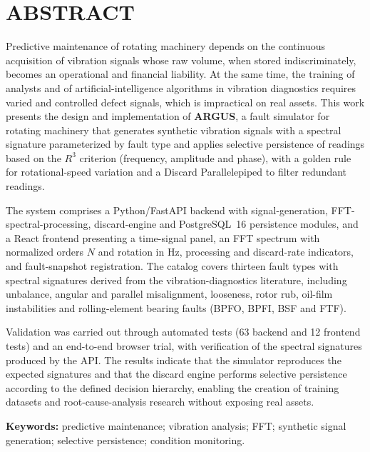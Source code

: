 \chapter*{ABSTRACT}

Predictive maintenance of rotating machinery depends on the continuous
acquisition of vibration signals whose raw volume, when stored
indiscriminately, becomes an operational and financial liability. At the same
time, the training of analysts and of artificial-intelligence algorithms in
vibration diagnostics requires varied and controlled defect signals, which is
impractical on real assets. This work presents the design and implementation of
\textbf{ARGUS}, a fault simulator for rotating machinery that generates synthetic
vibration signals with a spectral signature parameterized by fault type and
applies selective persistence of readings based on the \(R^3\) criterion
(frequency, amplitude and phase), with a golden rule for rotational-speed
variation and a Discard Parallelepiped to filter redundant readings.

The system comprises a Python/FastAPI backend with signal-generation,
FFT-spectral-processing, discard-engine and PostgreSQL~16 persistence modules,
and a React frontend presenting a time-signal panel, an FFT spectrum with
normalized orders \(N\) and rotation in Hz, processing and discard-rate
indicators, and fault-snapshot registration. The catalog covers thirteen fault
types with spectral signatures derived from the vibration-diagnostics
literature, including unbalance, angular and parallel misalignment, looseness,
rotor rub, oil-film instabilities and rolling-element bearing faults (BPFO,
BPFI, BSF and FTF).

Validation was carried out through automated tests (63 backend and 12 frontend
tests) and an end-to-end browser trial, with verification of the spectral
signatures produced by the API. The results indicate that the simulator
reproduces the expected signatures and that the discard engine performs
selective persistence according to the defined decision hierarchy, enabling the
creation of training datasets and root-cause-analysis research without exposing
real assets.

\vspace{0.6cm}
\noindent\textbf{Keywords:} predictive maintenance; vibration analysis; FFT;
synthetic signal generation; selective persistence; condition monitoring.
